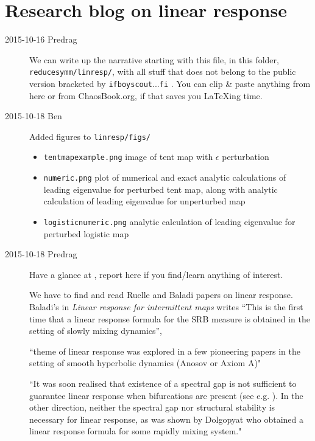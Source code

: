 
	
\chapter{Research blog on linear response}
\label{c-DailyBlog}

\begin{description}

\item[2015-10-16 Predrag] We can write up the narrative starting with
    this file, in this folder, \texttt{reducesymm/linresp/}, with all
    stuff that does not belong to the public version bracketed by
    \texttt{ifboyscout}...\texttt{fi} . You can clip \& paste anything
    from here or from ChaosBook.org, if that saves you LaTeXing time.

\item[2015-10-18 Ben] Added figures to \texttt{linresp/figs/}
\begin{itemize}
  \item \texttt{tentmapexample.png}
    image of tent map with $\epsilon$ perturbation
  \item \texttt{numeric.png}
    plot of numerical and exact analytic calculations of leading
    eigenvalue for perturbed tent map, along with analytic
    calculation of leading eigenvalue for unperturbed map
  \item \texttt{logisticnumeric.png}
    analytic calculation of leading eigenvalue for perturbed
    logistic map
\end{itemize}

\item[2015-10-18 Predrag]
Have a glance at
,
report here if you find/learn anything of interest.

We have to find and read Ruelle and
Baladi papers on linear response. Baladi's in
{\em Linear response for intermittent maps} writes ``This is the first
time that a linear response formula for the SRB measure is obtained in
the setting of slowly mixing dynamics'',

``theme of linear response was explored in a few pioneering
papers in the setting of smooth hyperbolic
dynamics (Anosov or Axiom A)"

``It was soon realised that existence of a spectral gap is not sufficient
to guarantee linear response when bifurcations are present (see e.g.
). In the other direction, neither the
spectral gap nor structural stability is necessary for linear response,
as was shown by Dolgopyat who obtained a linear response
formula for some rapidly mixing system."


\end{description}
